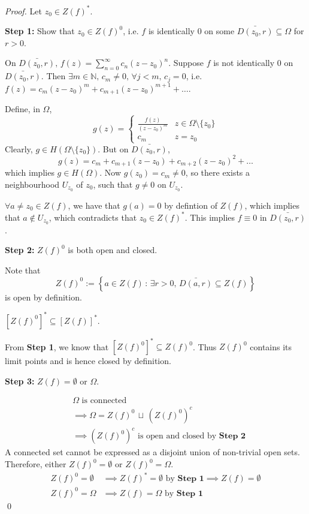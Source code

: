 \documentclass[notoc,notitlepage]{tufte-book}
\begin{document}
\begin{proof}
	Let $z_0 \in Z(f)^*$.

	\textbf{Step 1:} Show that $z_0 \in Z(f)^0$, i.e. $f$ is identically $0$ on some $\bar{D(z_0, r)} \subseteq \Omega$ for $r > 0$. 

	On $\bar{D(z_0, r)}, \, f(z) = \sum_{n=0}^{\infty} c_n (z - z_0)^n$. Suppose $f$ is not identically $0$ on $\bar{D(z_0, r)}$. Then $\exists m \in \mathbb{N}, \, c_m \neq 0, \, \forall j < m , \, c_j = 0$, i.e. $f(z) = c_m(z - z_0)^m + c_{m + 1}(z - z_0)^{m + 1} + \hdots$.

	Define, in $\Omega$,
	\begin{equation*}
		g(z) = \begin{cases}
			\frac{f(z)}{(z - z_0)^m} 	& z \in \Omega \setminus \{z_0\} \\
			c_m 						& z = z_0
		\end{cases}
	\end{equation*}
	Clearly, $g \in H(\Omega \setminus \{z_0\})$. But on $\bar{D(z_0, r)}$,
	\begin{equation*}
		g(z) = c_m + c_{m + 1}(z - z_0) + c_{m + 2}(z - z_0)^2 + \hdots
	\end{equation*}
	which implies $g \in H(\Omega)$. Now $g(z_0) = c_m \neq 0$, so there exists a neighbourhood $U_{z_0}$ of $z_0$, such that $g \neq 0$ on $U_{z_0}$.

	$\forall a \neq z_0 \in Z(f)$, we have that $g(a) = 0$ by defintion of $Z(f)$, which implies that $a \notin U_{z_0}$, which contradicts that $z_0 \in Z(f)^*$. This implies $f \equiv 0$ in $\bar{D(z_0, r)}$.

	\textbf{Step 2:} $Z(f)^0$ is both open and closed.

	Note that
	\begin{equation*}
		Z(f)^0 := \left\{a \in Z(f) \, : \, \exists r > 0, \, \bar{D(a, r)} \subseteq Z(f) \right\}
	\end{equation*}
	is open by definition.

	 $[Z(f)^0]^* \subseteq [Z(f)]^*$.

	From \textbf{Step 1}, we know that $[Z(f)^0]^* \subseteq Z(f)^0$. Thus $Z(f)^0$ contains its limit points and is hence closed by definition.

	\textbf{Step 3: } $Z(f) = \emptyset$ or $\Omega$.

	\begin{align*}
		& \Omega \text{ is connected} \\
		&\implies \Omega = Z(f)^0 \, \sqcup \, \left( Z(f)^0 \right)^c \\
		&\implies \left( Z(f)^0 \right)^c \text{ is open and closed by } \textbf{Step 2} 
	\end{align*}
	A connected set cannot be expressed as a disjoint union of non-trivial open sets. Therefore, either $Z(f)^0 = \emptyset$ or $Z(f)^0 = \Omega$.
	\begin{align*}
		Z(f)^0 = \emptyset &\implies Z(f)^* = \emptyset \text{ by } \textbf{Step 1} \implies Z(f) = \emptyset \\
		Z(f)^0 = \Omega &\implies Z(f) = \Omega \text{ by } \textbf{Step 1}  
	\end{align*} \qed
\end{proof}
\end{document}
